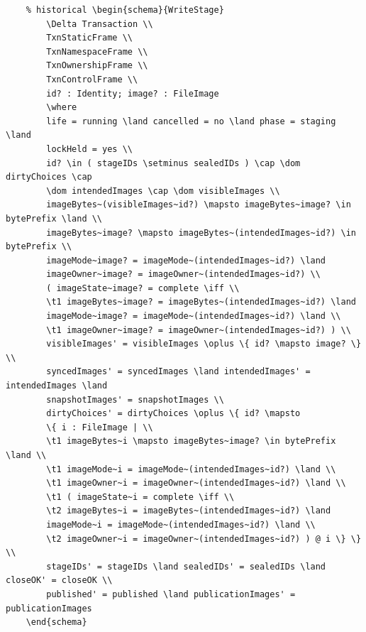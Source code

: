 \documentclass{article}
\begin{document}
\begin{verbatim}
	% historical \begin{schema}{WriteStage}
		\Delta Transaction \\
		TxnStaticFrame \\
		TxnNamespaceFrame \\
		TxnOwnershipFrame \\
		TxnControlFrame \\
		id? : Identity; image? : FileImage
		\where
		life = running \land cancelled = no \land phase = staging \land
		lockHeld = yes \\
		id? \in ( stageIDs \setminus sealedIDs ) \cap \dom dirtyChoices \cap
		\dom intendedImages \cap \dom visibleImages \\
		imageBytes~(visibleImages~id?) \mapsto imageBytes~image? \in bytePrefix \land \\
		imageBytes~image? \mapsto imageBytes~(intendedImages~id?) \in bytePrefix \\
		imageMode~image? = imageMode~(intendedImages~id?) \land
		imageOwner~image? = imageOwner~(intendedImages~id?) \\
		( imageState~image? = complete \iff \\
		\t1 imageBytes~image? = imageBytes~(intendedImages~id?) \land
		imageMode~image? = imageMode~(intendedImages~id?) \land \\
		\t1 imageOwner~image? = imageOwner~(intendedImages~id?) ) \\
		visibleImages' = visibleImages \oplus \{ id? \mapsto image? \} \\
		syncedImages' = syncedImages \land intendedImages' = intendedImages \land
		snapshotImages' = snapshotImages \\
		dirtyChoices' = dirtyChoices \oplus \{ id? \mapsto
		\{ i : FileImage | \\
		\t1 imageBytes~i \mapsto imageBytes~image? \in bytePrefix \land \\
		\t1 imageMode~i = imageMode~(intendedImages~id?) \land \\
		\t1 imageOwner~i = imageOwner~(intendedImages~id?) \land \\
		\t1 ( imageState~i = complete \iff \\
		\t2 imageBytes~i = imageBytes~(intendedImages~id?) \land
		imageMode~i = imageMode~(intendedImages~id?) \land \\
		\t2 imageOwner~i = imageOwner~(intendedImages~id?) ) @ i \} \} \\
		stageIDs' = stageIDs \land sealedIDs' = sealedIDs \land closeOK' = closeOK \\
		published' = published \land publicationImages' = publicationImages
	\end{schema}


\end{verbatim}
\end{document}
